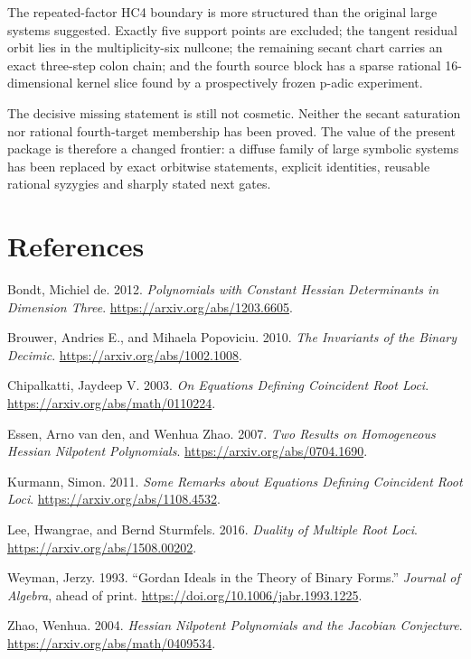 \documentclass[
  11pt,
]{article}
\newlength{\cslhangindent}
\newenvironment{CSLReferences}[2] %
 {\begin{list}{}{%
  \setlength{\itemindent}{0pt}
  \setlength{\leftmargin}{0pt}
  \setlength{\parsep}{0pt}
  \ifodd #1
   \setlength{\leftmargin}{\cslhangindent}
   \setlength{\itemindent}{-1\cslhangindent}
  \fi
  \setlength{\itemsep}{#2\baselineskip}}}
 {\end{list}}
\begin{document}
The repeated-factor HC4 boundary is more structured than the original
large systems suggested. Exactly five support points are excluded; the
tangent residual orbit lies in the multiplicity-six nullcone; the
remaining secant chart carries an exact three-step colon chain; and the
fourth source block has a sparse rational 16-dimensional kernel slice
found by a prospectively frozen p-adic experiment.

The decisive missing statement is still not cosmetic. Neither the secant
saturation nor rational fourth-target membership has been proved. The
value of the present package is therefore a changed frontier: a diffuse
family of large symbolic systems has been replaced by exact orbitwise
statements, explicit identities, reusable rational syzygies and sharply
stated next gates.

\section{References}\label{references}

\protect{}\label{refs}
\begin{CSLReferences}{1}{1}
Bondt, Michiel de. 2012. \emph{Polynomials with Constant Hessian
Determinants in Dimension Three}. \url{https://arxiv.org/abs/1203.6605}.

Brouwer, Andries E., and Mihaela Popoviciu. 2010. \emph{The Invariants
of the Binary Decimic}. \url{https://arxiv.org/abs/1002.1008}.

Chipalkatti, Jaydeep V. 2003. \emph{On Equations Defining Coincident
Root Loci}. \url{https://arxiv.org/abs/math/0110224}.

Essen, Arno van den, and Wenhua Zhao. 2007. \emph{Two Results on
Homogeneous Hessian Nilpotent Polynomials}.
\url{https://arxiv.org/abs/0704.1690}.

Kurmann, Simon. 2011. \emph{Some Remarks about Equations Defining
Coincident Root Loci}. \url{https://arxiv.org/abs/1108.4532}.

Lee, Hwangrae, and Bernd Sturmfels. 2016. \emph{Duality of Multiple Root
Loci}. \url{https://arxiv.org/abs/1508.00202}.

Weyman, Jerzy. 1993. {``Gordan Ideals in the Theory of Binary Forms.''}
\emph{Journal of Algebra}, ahead of print.
\url{https://doi.org/10.1006/jabr.1993.1225}.

Zhao, Wenhua. 2004. \emph{Hessian Nilpotent Polynomials and the Jacobian
Conjecture}. \url{https://arxiv.org/abs/math/0409534}.

\end{CSLReferences}
\end{document}
